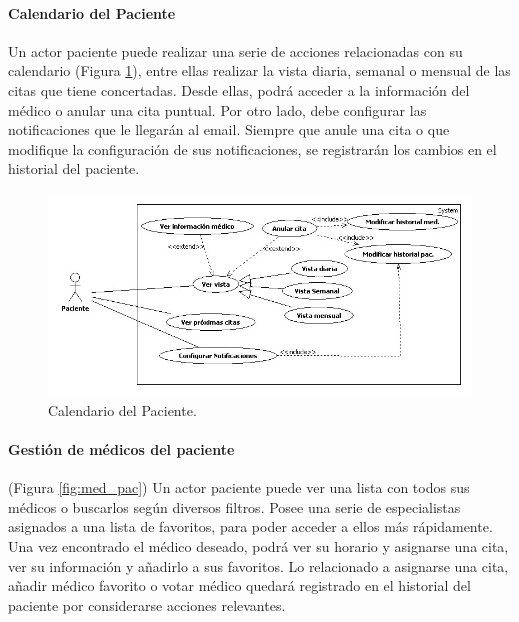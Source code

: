 			\paragraph{Calendario del Paciente} %
			\label{par:calendario_del_paciente}
				Un actor paciente puede realizar una serie de acciones relacionadas con su calendario (Figura \ref{fig:cal_pac}), entre ellas realizar la vista diaria, semanal o mensual de las citas que tiene concertadas. Desde ellas, podrá acceder a la información del médico o anular una cita puntual. Por otro lado, debe configurar las notificaciones que le llegarán al email. Siempre que anule una cita o que modifique la configuración de sus notificaciones, se registrarán los cambios en el historial del paciente.
				\begin{figure}[H]
				  \centering
				    \includegraphics[width=14cm]{img/jpg/casos_uso/Calendario_del_paciente.jpg}
				  \caption{Calendario del Paciente.}
				  \label{fig:cal_pac}
				\end{figure}
		
			\paragraph{Gestión de médicos del paciente} %
			\label{par:gestion_de_medicos_del_paciente}
			
				(Figura \ref{fig:med_pac}) Un actor paciente puede ver una lista con todos sus médicos o buscarlos según diversos filtros. Posee una serie de especialistas asignados a una lista de favoritos, para poder acceder a ellos más rápidamente. Una vez encontrado el médico deseado, podrá ver su horario y asignarse una cita, ver su información y añadirlo a sus favoritos. Lo relacionado a asignarse una cita, añadir médico favorito o votar médico quedará registrado en el historial del paciente por considerarse acciones relevantes.
				
